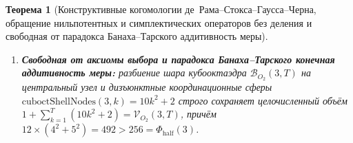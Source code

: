 \documentclass[11pt,a4paper]{article}
\theoremstyle{plain}
\newtheorem{theorem}{Теорема}[section]
\theoremstyle{definition}
\begin{document}
\begin{theorem}[Конструктивные когомологии де~Рама--Стокса--Гаусса--Черна, обращение нильпотентных и симплектических операторов без деления и свободная от парадокса Банаха--Тарского аддитивность меры]
\begin{enumerate}[label=\textbf{(\roman*)},leftmargin=*]
  симплектический шаг Верле $(u,v)\mapsto(2u-v+\Phi,u)$ ($\det = +1\in\mathrm{SL}_2(\mathbb{Z})$) обращается на месте отображением $(u',v')\mapsto(v',2v'-u'+\Phi)$, а $4$-мерный нильпотентный оператор $\mathcal{M} = I_4 + N_{\mathrm{nil}}$ ($N_{\mathrm{nil}}^3 = 0$, $\det(2\mathcal{M}) = 24$) обращается конечным трёхчленным рядом Неймана $\mathcal{M}^{-1} = I_4 - N_{\mathrm{nil}} + N_{\mathrm{nil}}^2$.
\item \textbf{Свободная от аксиомы выбора и парадокса Банаха--Тарского конечная аддитивность меры:}
  разбиение шара кубооктаэдра $\mathcal{B}_{O_2}(3,T)$ на центральный узел и дизъюнктные координационные сферы $\mathrm{cuboctShellNodes}(3,k) = 10k^2+2$ строго сохраняет целочисленный объём $1 + \sum_{k=1}^T(10k^2+2) = \mathcal{V}_{O_2}(3,T)$, причём $12\times(4^2+5^2) = 492 > 256 = \Phi_{\mathrm{half}}(3)$.
\end{enumerate}
\end{theorem}
\end{document}
